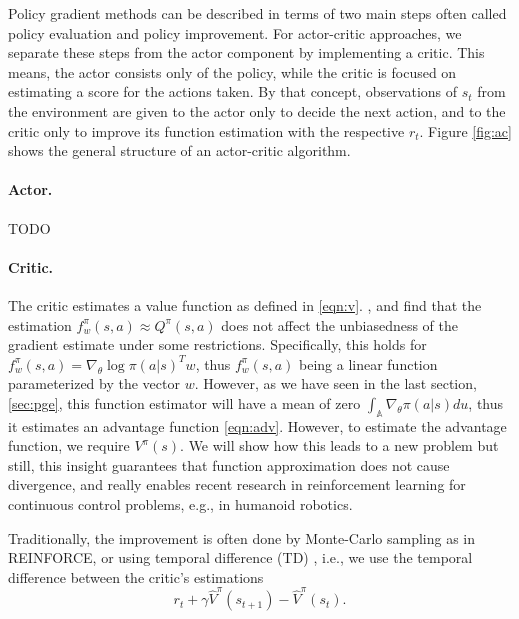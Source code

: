 Policy gradient methods can be described in terms of two main steps often called policy evaluation and policy improvement. 
For actor-critic approaches, we separate these steps from the actor component by implementing a critic. 
This means, the actor consists only of the policy, while the critic is focused on estimating a score for the actions taken. 
By that concept, observations of $s_t$ from the environment are given to the actor only to decide the next action, and to the critic only to improve its function estimation with the respective $r_t$. 
Figure \ref{fig:ac} shows the general structure of an actor-critic algorithm.

\paragraph{Actor.} 
TODO

\paragraph{Critic.} 
The critic estimates a value function as defined in \eqref{eqn:v}. 
\cite{Sutton:1999:PGM:3009657.3009806}, and \cite{Konda:2003:AA:942271.942292} find that the estimation $f_w^\pi(s,a) \approx Q^\pi(s,a)$ does not affect the unbiasedness of the gradient estimate under some restrictions. 
Specifically, this holds for $f_w^\pi(s,a) = {\nabla_\theta \log\pi(a|s)}^T w$, thus $f_w^\pi(s,a)$ being a linear function parameterized by the vector $w$. 
However, as we have seen in the last section, \ref{sec:pge}, this function estimator will have a mean of zero $\int_\mathbb{A} \nabla_\theta \pi(a|s)du $, thus it estimates an advantage function \ref{eqn:adv}. 
However, to estimate the advantage function, we require $V^\pi(s)$. 
We will show how this leads to a new problem but still, this insight guarantees that function approximation does not cause divergence, and really enables recent research in reinforcement learning for continuous control problems, e.g., in humanoid robotics.

Traditionally, the improvement is often done by Monte-Carlo sampling as in REINFORCE, or using temporal difference (TD) \cite{Sutton1988}, i.e., we use the temporal difference between the critic's estimations 
\begin{equation}
  r_t + \gamma \hat{V}^\pi(s_{t+1}) - \hat{V}^\pi(s_t).
\end{equation}

